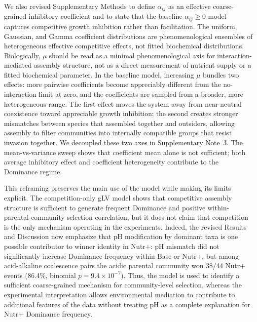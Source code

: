We also revised Supplementary Methods to define $\alpha_{ij}$ as an effective coarse-grained inhibitory coefficient and to state that the baseline $\alpha_{ij}\geq 0$ model captures competitive growth inhibition rather than facilitation. The uniform, Gaussian, and Gamma coefficient distributions are phenomenological ensembles of heterogeneous effective competitive effects, not fitted biochemical distributions. Biologically, $\mu$ should be read as a minimal phenomenological axis for interaction-mediated assembly structure, not as a direct measurement of nutrient supply or a fitted biochemical parameter. In the baseline model, increasing $\mu$ bundles two effects: more pairwise coefficients become appreciably different from the no-interaction limit at zero, and the coefficients are sampled from a broader, more heterogeneous range. The first effect moves the system away from near-neutral coexistence toward appreciable growth inhibition; the second creates stronger mismatches between species that assembled together and outsiders, allowing assembly to filter communities into internally compatible groups that resist invasion together. We decoupled these two axes in Supplementary Note~3. The mean-vs-variance sweep shows that coefficient mean alone is not sufficient; both average inhibitory effect and coefficient heterogeneity contribute to the Dominance regime.

This reframing preserves the main use of the model while making its limits explicit. The competition-only gLV model shows that competitive assembly structure is sufficient to generate frequent Dominance and positive within-parental-community selection correlation, but it does not claim that competition is the only mechanism operating in the experiments. Indeed, the revised Results and Discussion now emphasize that pH modification by dominant taxa is one possible contributor to winner identity in Nutr$+$: pH mismatch did not significantly increase Dominance frequency within Base or Nutr$+$, but among acid-alkaline coalescence pairs the acidic parental community won 38/44 Nutr$+$ events (86.4\%, binomial $p = 9.4 \times 10^{-7}$). Thus, the model is used to identify a sufficient coarse-grained mechanism for community-level selection, whereas the experimental interpretation allows environmental mediation to contribute to additional features of the data without treating pH as a complete explanation for Nutr$+$ Dominance frequency.

